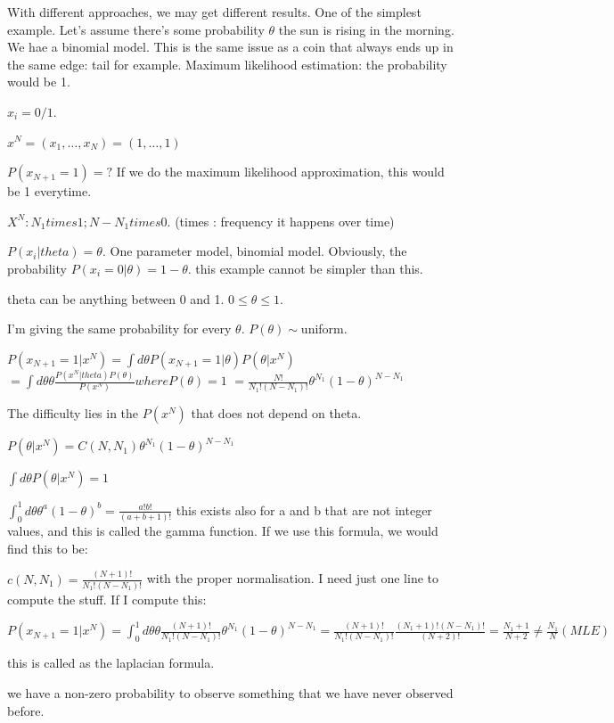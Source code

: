 With different approaches, we may get different results. One of the simplest
example.
Let's assume there's some probability $\theta$ the sun is rising in the morning.
We hae a binomial model. This is the same issue as a coin that always ends up
in the same edge: tail for example.
Maximum likelihood estimation: the probability would be 1.

$x_i = 0/1.$

$x^N = (x_1, \ldots ,x_N) = (1,\ldots,1)$

$P(x_{N+1} = 1) = ?$
If we do the maximum likelihood approximation, this would be 1 everytime.

$X^N : N_1 times 1 ; N-N_1 times 0.$ (times : frequency it happens over time)

$P(x_i|theta) = \theta$. One parameter model, binomial model.
Obviously, the probability $P(x_i=0|\theta) = 1 - \theta$. this example cannot be
simpler than this.


theta can be anything between 0 and 1. $0 \leq \theta \leq 1$.

I'm giving the same probability for every $\theta$. $P(\theta) \sim $uniform.

$P(x_{N+1} =1|x^N) = \int d\theta P(x_{N+1}=1|\theta) P(\theta|x^N)$
$= \int d\theta \theta \frac{P(x^N|theta)P(\theta)}{P(x^N)} where P(\theta) = 1$
$= \frac{N!}{N_1!(N-N_1)!} \theta^{N_1} (1-\theta)^{N-N_1}$

The difficulty lies in the $P(x^N)$ that does not depend on theta.

$P(\theta|x^N)=C(N,N_1) \theta^{N_1} (1-\theta)^{N-N_1}$

$\int d\theta P(\theta|x^N) = 1$

$\int_0^1 d\theta \theta^a (1-\theta)^b = \frac{a!b!}{(a+b+1)!}$
this exists also for a and b that are not integer values, and this is called the
gamma function.
If we use this formula, we would find this to be:

$c(N,N_1) = \frac{(N+1)!}{N_1!(N-N_1)!}$
with the proper normalisation.
I need just one line to compute the stuff.
If I compute this:

$P(x_{N+1}=1|x^N) = \int_0^1 d\theta \theta \frac{(N+1)!}{N_1!(N-N_1)!} \theta^{N_1} (1 - \theta)^{N-N_1}
= \frac{(N+1)!}{N_1!(N-N_1)!} \frac{(N_1 + 1)! (N-N_1)!}{(N+2)!}
= \frac{N_1 + 1}{N+2} \neq \frac{N_1}{N} (MLE)$

this is called as the laplacian formula.

we have a non-zero probability to observe something that we have never observed
before.

